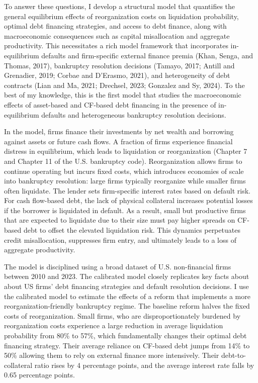 \documentclass[12pt]{article}
\begin{document}
To answer these questions, I develop a structural model that quantifies the general equilibrium effects of reorganization costs on liquidation probability, optimal debt financing strategies, and access to debt finance, along with macroeconomic consequences such as capital misallocation and aggregate productivity. This necessitates a rich model framework that incorporates in-equilibrium defaults and firm-specific external finance premia (Khan, Senga, and Thomas, 2017), bankruptcy resolution decisions (Tamayo, 2017; Antill and Grenadier, 2019; Corbae and D'Erasmo, 2021), and heterogeneity of debt contracts (Lian and Ma, 2021; Drechsel, 2023; Gonzalez and Sy, 2024). To the best of my knowledge, this is the first model that studies the macroeconomic effects of asset-based and CF-based debt financing in the presence of in-equilibrium defaults and heterogeneous bankruptcy resolution decisions. 

In the model, firms finance their investments by net wealth and borrowing against assets or future cash flows. A fraction of firms experience financial distress in equilibrium, which leads to liquidation or reorganization (Chapter 7 and Chapter 11 of the U.S. bankruptcy code). Reorganization allows firms to continue operating but incurs fixed costs, which introduces economies of scale into bankruptcy resolution: large firms typically reorganize while smaller firms often liquidate. The lender sets firm-specific interest rates based on default risk. For cash flow-based debt, the lack of physical collateral increases potential losses if the borrower is liquidated in default. As a result, small but productive firms that are expected to liquidate due to their size must pay higher spreads on CF-based debt to offset the elevated liquidation risk. This dynamics perpetuates credit misallocation, suppresses firm entry, and ultimately leads to a loss of aggregate productivity.

The model is disciplined using a broad dataset of U.S. non-financial firms between 2010 and 2023. The calibrated model closely replicates key facts about about US firms' debt financing strategies and default resolution decisions. I use the calibrated model to estimate the effects of a reform that implements a more reorganization-friendly bankruptcy regime. The baseline reform halves the fixed costs of reorganization. Small firms, who are disproportionately burdened by reorganization costs experience a large reduction in average liquidation probability from 80\% to 57\%, which fundamentally changes their optimal debt financing strategy. Their average reliance on CF-based debt jumps from 14\% to 50\% allowing them to rely on external finance more intensively. Their debt-to-collateral ratio rises by 4 percentage points, and the average interest rate falls by 0.65 percentage points. 
\end{document}
